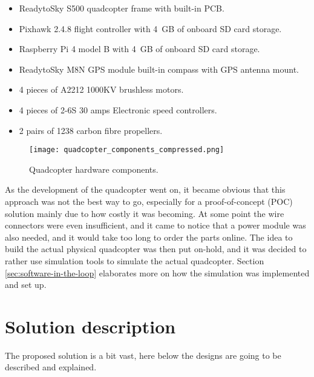 \begin{itemize}
    \item ReadytoSky S500 quadcopter frame with built-in PCB.
    \item Pixhawk 2.4.8 flight controller with 4 GB of onboard SD card storage.
    \item Raspberry Pi 4 model B with 4 GB of onboard SD card storage.
    \item ReadytoSky M8N GPS module built-in compass with GPS antenna mount.
    \item 4 pieces of A2212 1000KV brushless motors.
    \item 4 pieces of 2-6S 30 amps Electronic speed controllers.
    \item 2 pairs of 1238 carbon fibre propellers.
\end{itemize}

\begin{figure}[H]
    \centering \texttt{[image: quadcopter\_components\_compressed.png]}
    \caption{Quadcopter hardware components.}
    \label{fig:quadcopter-hardware-components}
\end{figure}

As the development of the quadcopter went on, it became obvious that this approach was not the best way to go, especially for a proof-of-concept (POC) solution mainly due to how costly it was becoming. At some point the wire connectors were even insufficient, and it came to notice that a power module was also needed, and it would take too long to order the parts online. The idea to build the actual physical quadcopter was then put on-hold, and it was decided to rather use simulation tools to simulate the actual quadcopter. Section \ref{sec:software-in-the-loop} elaborates more on how the simulation was implemented and set up.




\section{Solution description}
\label{sec:solution-description}

The proposed solution is a bit vast, here below the designs are going to be described and explained.



